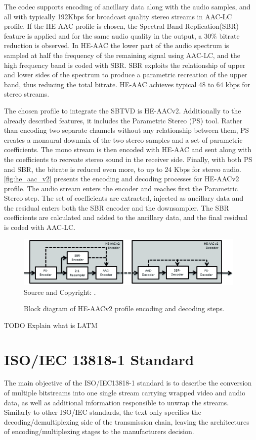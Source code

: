\documentclass[
	12pt,				%
	openright,			%
	twoside,			%
	a4paper,			%
	brazil,
	french,				%
	english
	]{abntex2}
\begin{document}
The codec supports encoding of ancillary data along with the audio samples, and all with typically 192Kbps for broadcast quality stereo streams in AAC-LC profile. If the HE-AAC profile is chosen, the Spectral Band Replication(SBR) feature is applied and for the same audio quality in the output, a 30\% bitrate reduction is observed. In HE-AAC the lower part of the audio spectrum is sampled at half the frequency of the remaining signal using AAC-LC, and the high frequency band is coded with SBR. SBR exploits the relationship of upper and lower sides of the spectrum to produce a parametric recreation of the upper band, thus reducing the total bitrate. HE-AAC achieves typical 48 to 64 kbps for stereo streams.

The chosen profile to integrate the SBTVD is HE-AACv2. Additionally to the already described features, it includes the Parametric Stereo (PS) tool. Rather than encoding two separate channels without any relationship between them, PS creates a monaural downmix of the two stereo samples and a set of parametric coefficients. The mono stream is then encoded with HE-AAC and sent along with the coefficients to recreate stereo sound in the receiver side. Finally, with both PS and SBR, the bitrate is reduced even more, to up to 24 Kbps for stereo audio. \autoref{fig:he_aac_v2} presents the encoding and decoding processes for HE-AACv2 profile. The audio stream enters the encoder and reaches first the Parametric Stereo step. The set of coefficients are extracted, injected as ancillary data and the residual enters both the SBR encoder and the downsampler. The SBR coefficients are calculated and added to the ancillary data, and the final residual is coded with AAC-LC.

\begin{figure}
\centering
\caption{Block diagram of HE-AACv2 profile encoding and decoding steps.}
\includegraphics[width=1\linewidth]{figuras/he_aac_v2.png}
\\Source and Copyright: \cite{fraunhofer}.
\label{fig:he_aac_v2}
\end{figure}

TODO Explain what is LATM

\chapter{ISO/IEC 13818-1 Standard}
\label{iso13818}
The main objective of the ISO/IEC13818-1 standard is to describe the conversion of multiple bitstreams into one single stream carrying wrapped video and audio data, as well as additional information responsible to unwrap the streams. Similarly to other ISO/IEC standards, the text only specifies the decoding/demultiplexing side of the transmission chain, leaving the architectures of encoding/multiplexing stages to the manufacturers decision.
\end{document}
